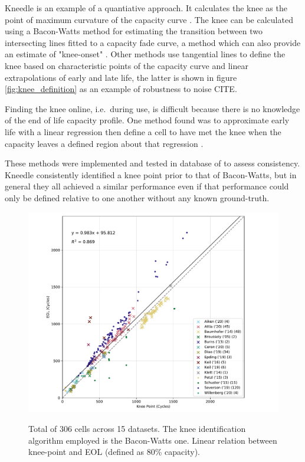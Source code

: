 \documentclass{article}
\begin{document}
Kneedle is an example of a quantiative approach. It calculates the knee as the point of maximum curvature of the capacity curve \cite{satopaa_finding_2011}. The knee can be calculated using a Bacon-Watts method for estimating the transition between two intersecting lines fitted to a capacity fade curve, a method which can also provide an estimate of "knee-onset" \cite{fermin-cueto_identification_2020}. Other methods use tangential lines to define the knee based on characteristic points of the capacity curve \cite{diao_algorithm_2019} and linear extrapolations of early and late life, the latter is shown in figure \ref{fig:knee_definition} as an example of robustness to noise CITE.

Finding the knee online, i.e.\ during use, is difficult because there is no knowledge of the end of life capacity profile. One method found was to approximate early life with a linear regression then define a cell to have met the knee when the capacity leaves a defined region about that regression \cite{zhang_accelerated_2019}.

These methods were implemented and tested in database of \cite{severson_data-driven_2019} to assess consistency. Kneedle consistently identified a knee point prior to that of Bacon-Watts, but in general they all achieved a similar performance even if that performance could only be defined relative to one another without any known ground-truth.




\begin{figure}[ht]
\centering
\includegraphics[width=0.8\linewidth]{figures/AcrossDatasetsknee-to-EOL}
  \label{fig:kneepoint2EOL}
\caption{Total of 306 cells across 15 datasets. The knee identification algorithm employed is the Bacon-Watts one. Linear relation between knee-point and EOL (defined as 80\% capacity).}
\label{fig:knees2EOL}
\end{figure}
\end{document}
